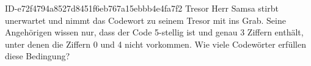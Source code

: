 \begin{exercise}
      {ID-e72f4794a8527d8451f6eb767a15ebbb4e4fa7f2}
      {Tresor}
  \ifproblem\problem
    Herr Samsa stirbt unerwartet und nimmt das Codewort zu seinem Tresor mit
    ins Grab. Seine Angehörigen wissen nur, dass der Code 5-stellig ist und genau
    3 Ziffern enthält, unter denen die Ziffern 0 und 4 nicht vorkommen. Wie viele
    Codewörter erfüllen diese Bedingung?
  \fi
\end{exercise}
